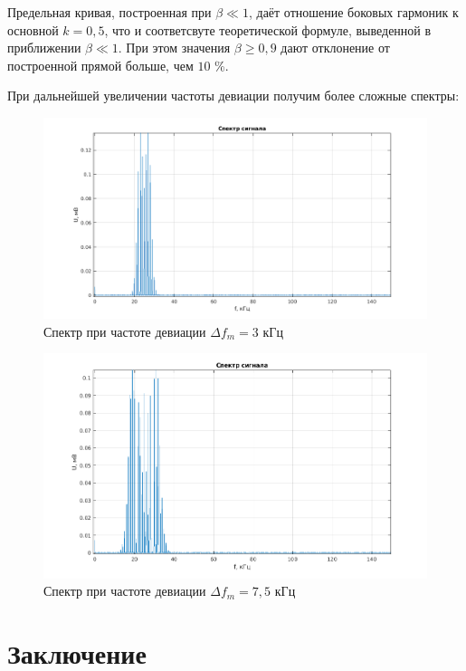 \documentclass[a4paper, 12pt]{article}%
\begin{document}
Предельная кривая, построенная при $\beta \ll 1$, даёт отношение боковых гармоник к основной $k = 0,5$, что и соответсвуте теоретической формуле, выведенной в приближении $\beta \ll 1$. При этом значения $\beta \geqslant 0,9$ дают отклонение от построенной прямой больше, чем $10$ \%.

При дальнейшей увеличении частоты девиации получим более сложные спектры:

\newpage

\begin{figure}[!h]
    \centering
    \includegraphics[width = 15 cm]{images/4_3.png}
    \caption{Спектр при частоте девиации $\Delta f_m = 3$ кГц}
\end{figure}


\begin{figure}[!h]
    \centering
    \includegraphics[width = 15 cm]{images/4_7.5.png}
    \caption{Спектр при частоте девиации $\Delta f_m = 7,5$ кГц}
\end{figure}

\newpage

\section{Заключение}
\end{document}
